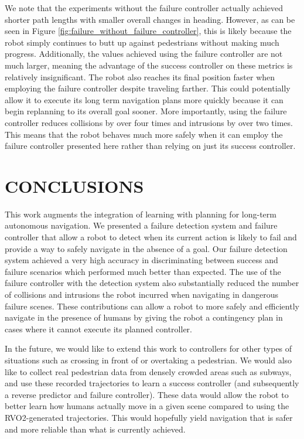 \documentclass[letterpaper, 10 pt, conference]{ieeeconf}  %
\begin{document}
	We note that the experiments without the failure controller actually achieved shorter path lengths with smaller overall changes in heading. However, as can be seen in Figure \ref{fig:failure_without_failure_controller}, this is likely because the robot simply continues to butt up against pedestrians without making much progress. Additionally, the values achieved using the failure controller are not much larger, meaning the advantage of the success controller on these metrics is relatively insignificant. The robot also reaches its final position faster when employing the failure controller despite traveling farther. This could potentially allow it to execute its long term navigation plans more quickly because it can begin replanning to its overall goal sooner. More importantly, using the failure controller reduces collisions by over four times and intrusions by over two times. This means that the robot behaves much more safely when it can employ the failure controller presented here rather than relying on just its success controller. 

\section{CONCLUSIONS}\label{sec:conclusion}

	This work augments the integration of learning with planning for long-term autonomous navigation. We presented a failure detection system and failure controller that allow a robot to detect when its current action is likely to fail and provide a way to safely navigate in the absence of a goal. Our failure detection system achieved a very high accuracy in discriminating between success and failure scenarios which performed much better than expected. The use of the failure controller with the detection system also substantially reduced the number of collisions and intrusions the robot incurred when navigating in dangerous failure scenes. These contributions can allow a robot to more safely and efficiently navigate in the presence of humans by giving the robot a contingency plan in cases where it cannot execute its planned controller.
	
	In the future, we would like to extend this work to controllers for other types of situations such as crossing in front of or overtaking a pedestrian. We would also like to collect real pedestrian data from densely crowded areas such as subways, and use these recorded trajectories to learn a success controller (and subsequently a reverse predictor and failure controller). These data would allow the robot to better learn how humans actually move in a given scene compared to using the RVO2-generated trajectories. This would hopefully yield navigation that is safer and more reliable than what is currently achieved.
\end{document}
